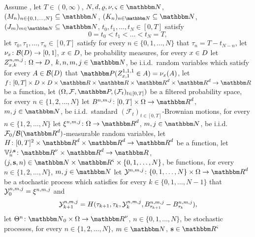 \begin{algo}
	\label{def:general_algorithm}
	Assume ,
	let
	$T \in (0,\infty)$,
	$N, d, \varrho, \nu, \varsigma \in \N$,
	$(M_n)_{n\in\{0,1,\ldots,N\}}\subseteq\N$,
	$(K_n)_{n\in \N}\subseteq\N$,
	$(J_m)_{m \in \N} \subseteq \N$,
	$t_0,t_1,\ldots,t_N\in [0,T]$ satisfy
	\begin{equation}
		0 = t_0 < t_1 < \ldots < t_N = T,
	\end{equation}
	let $\tau_0, \tau_1, \dots,\tau_n \in [0,T]$ satisfy for every 
	$n \in \{0, 1, \dots, N\}$ that 
	$\tau_n= T-t_{N-n}$,
	let
	$\nu_x \colon \mathcal{B}( D )\to [0,1]$,
	$x \in D$,
	be probability measures, for every
	$x \in D$
	let
	$Z^{ n, m,j }_{ x, k } \colon \Omega \to D$,
	$k, n, m, j \in \N$,
	be i.i.d.\ random variables which satisfy for every
	$ A \in \mathcal{B}( D ) $
	that
	$\P( Z_{ x, 1 }^{ 1, 1,1 } \in A ) = \nu_x( A )$,
	let
	$f\colon [0,T] \times \D \times \D \times \R \times \R \times\R^d \times \R^d \to \R$
	be a function,
	let
	$
	( \Omega, \F, \P, ( \mathcal{F}_t )_{ t \in [0,T] } )
	$
	be a filtered probability space,
	for every
	$n \in \{1,2,\ldots,N\}$
	let
	$
	B^{n,m,j} \colon [0,T] \times \Omega \to \R^d
	$,
	$
	m,j \in \N
	$,
	be i.i.d.\ standard
	$( \mathcal{F}_t )_{ t \in [0,T] }$-Brownian motions,
	for every    $n \in \{1, 2, \ldots,N\}$  let
	$
	\xi^{n,m,j}\colon\Omega\to\R^d
	$,
	$
	m, j \in \N $,
	be i.i.d.\ $ \mathcal{F}_0/ \B(\R^d) $-measurable random variables,
	let
	$H\colon [0,T]^2\times\R^d\times\R^d\to\R^d$
	be a function,
	let
	$ \bV^{j,{\textbf s}}_n\colon\R^\nu\times\R^d \to\R$, $(j,{\textbf{s}},n)\in \N \times \R^\varsigma \times\{0, 1, \dots,N\}$,
	be functions, 
	for every
	$ n \in \{1, 2, \ldots,N\}$,
	$ m,j \in \N $
	let
	$\Y^{n,m,j}\colon \{0,1,\ldots,N\}\times\Omega\to\R^d$
	be a stochastic process which satisfies for every 
	$k\in\{0,1,\ldots,N-1\}$ that ${\mathcal{Y}}^{n,m,j}_0 = \xi^{ n, m, j }$  and
	\begin{equation}\label{eq:FormalXapprox}
	{\ensuremath{\mathcal{Y}}}^{n,m,j}_{k+1}
	=
	H(\tau_{k+1},\tau_{k},{\mathcal{Y}}^{n,m,j}_k,B^{n,m,j}_{\tau_{k + 1}} - B^{n,m,j}_{\tau_{k}}),
	\end{equation}
	let $\Theta^{n}\colon\N_0\times\Omega\to\R^{\nu}$, $n \in \{0, 1, \dots, N\}$, be stochastic processes,
	for every
	$n\in\{1,2,\ldots,N\}$,
	$m\in\N$,
	${\textbf s}\in\R^{\varsigma}$

\end{algo}
